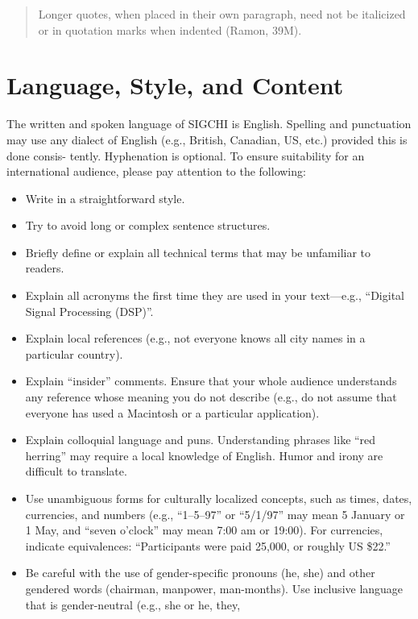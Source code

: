 \documentclass[chi_draft]{sigchi}
\begin{document}
\begin{quote}
Longer quotes, when placed in their own paragraph, need not be
italicized or in quotation marks when indented (Ramon, 39M).  
\end{quote}

\section{Language, Style, and Content}

The written and spoken language of SIGCHI is English. Spelling and
punctuation may use any dialect of English (e.g., British, Canadian,
US, etc.) provided this is done consis- tently. Hyphenation is
optional. To ensure suitability for an international audience, please
pay attention to the following:

\begin{itemize}
\item Write in a straightforward style.
\item Try to avoid long or complex sentence structures.
\item Briefly define or explain all technical terms that may be
  unfamiliar to readers.
\item Explain all acronyms the first time they are used in your
  text---e.g., ``Digital Signal Processing (DSP)''.
\item Explain local references (e.g., not everyone knows all city
  names in a particular country).
\item Explain ``insider'' comments. Ensure that your whole audience
  understands any reference whose meaning you do not describe (e.g.,
  do not assume that everyone has used a Macintosh or a particular
  application).
\item Explain colloquial language and puns. Understanding phrases like
  ``red herring'' may require a local knowledge of English.  Humor and
  irony are difficult to translate.
\item Use unambiguous forms for culturally localized concepts, such as
  times, dates, currencies, and numbers (e.g., ``1--5--97'' or
  ``5/1/97'' may mean 5 January or 1 May, and ``seven o'clock'' may
  mean 7:00 am or 19:00). For currencies, indicate equivalences:
  ``Participants were paid {\selectfont \textwon}
  25,000, or roughly US \$22.''
\item Be careful with the use of gender-specific pronouns (he, she)
  and other gendered words (chairman, manpower, man-months). Use
  inclusive language that is gender-neutral (e.g., she or he, they,

\end{itemize}
\end{document}

